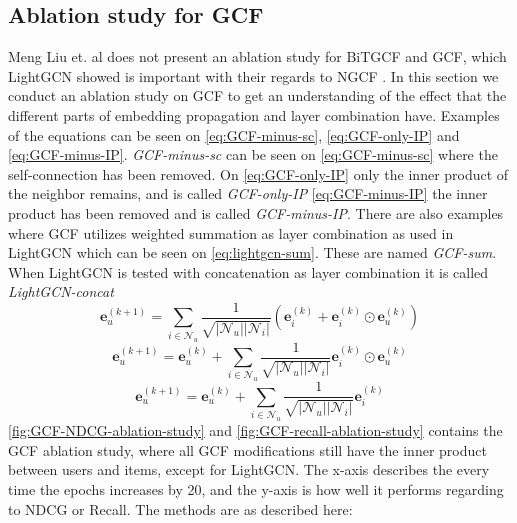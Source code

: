 \subsection{Ablation study for GCF}
Meng Liu et. al does not present an ablation study for BiTGCF and GCF, which LightGCN showed is important with their regards to NGCF \cite{lightgcn,BiTGCF}.
In this section we conduct an ablation study on GCF to get an understanding of the effect that the different parts of embedding propagation and layer combination have.
Examples of the equations can be seen on \autoref{eq:GCF-minus-sc}, \autoref{eq:GCF-only-IP} and \autoref{eq:GCF-minus-IP}.
\textit{GCF-minus-sc} can be seen on \autoref{eq:GCF-minus-sc} where the self-connection has been removed.
On \autoref{eq:GCF-only-IP} only the inner product of the neighbor remains, and is called \textit{GCF-only-IP}
\autoref{eq:GCF-minus-IP} the inner product has been removed and is called \textit{GCF-minus-IP}.
There are also examples where GCF utilizes weighted summation as layer combination as used in LightGCN which can be seen on \autoref{eq:lightgcn-sum}.
These are named \textit{GCF-sum}.
When LightGCN is tested with concatenation as layer combination it is called \textit{LightGCN-concat}
\begin{equation}
    \mathbf{e}_{u}^{(k+1)} = \sum^{}_{i \in \mathcal{N}_u}  \frac{1}{\sqrt{|\mathcal{N}_u||\mathcal{N}_i|}}\left( \mathbf{e}_i^{(k)} + \mathbf{e}_i^{(k)} \odot \mathbf{e}_u^{(k)} \right)
    \label{eq:GCF-minus-sc}
\end{equation}
\begin{equation}
    \mathbf{e}_{u}^{(k+1)} = \mathbf{e}_{u}^{(k)} + \sum^{}_{i \in \mathcal{N}_u}  \frac{1}{\sqrt{|\mathcal{N}_u||\mathcal{N}_i|}} \mathbf{e}_i^{(k)} \odot \mathbf{e}_u^{(k)}
    \label{eq:GCF-only-IP}
\end{equation}
\begin{equation}
    \mathbf{e}_{u}^{(k+1)} = \mathbf{e}_{u}^{(k)} + \sum^{}_{i \in \mathcal{N}_u}  \frac{1}{\sqrt{|\mathcal{N}_u||\mathcal{N}_i|}} \mathbf{e}_i^{(k)}
    \label{eq:GCF-minus-IP}
\end{equation}
\autoref{fig:GCF-NDCG-ablation-study} and \autoref{fig:GCF-recall-ablation-study} contains the GCF ablation study, where all GCF modifications still have the inner product between users and items, except for LightGCN.
The x-axis describes the every time the epochs increases by 20, and the y-axis is how well it performs regarding to NDCG or Recall.
The methods are as described here:\\
